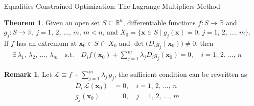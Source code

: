 \documentclass[10pt]{beamer}
\newcommand{\ds}{\displaystyle}
\theoremstyle{definition}
\newtheorem*{thm}{Theorem}
\newtheorem*{rmk}{Remark}
\newcommand{\vx}{\mathbf{x}}
\begin{document}
\begin{frame}{Equalities Constrained Optimization: The Lagrange Multipliers Method}


\begin{thm}%
  Given an open set $S\subseteq\mathbb{R}^n$, differentiable functions $f:S\to\mathbb{R}$ and $g_j:S\to\mathbb{R}$, $j=1,\,2,\,\ldots,\,m$, $m < n$, and $\ds X_0 = \big\{\vx\in S\;|\;g_j(\vx) = 0,\,j=1,\,2,\,\ldots,\,m\big\}$. If $f$ has an extremum at $\ds\vx_0\in S\,\cap\,X_0$ and $\det\big(D_i g_j(\vx_0)\big)\ne 0$, then
  \begin{align*}
    \exists\,\lambda_1,\,\lambda_2,\,\ldots,\,\lambda_m\quad\text{s.t.}\quad D_i f(\vx_0) + \sum_{j = 1}^m\lambda_j D_i g_j(\vx_0) = 0,\quad\ds i = 1,\,2,\,\ldots,\,n
  \end{align*}
\end{thm}
\begin{rmk}
  Let $\ds\mathcal{L}\equiv f + \sum_{j = 1}^m \lambda_j\,g_j$, the sufficient condition can be rewritten as
  \begin{align*}
    D_i\,\mathcal{L}(\vx_0) &= 0,\quad i = 1,\,2,\,\ldots,\,n \\
    g_j(\vx_0) &= 0,\quad j=1,\,2,\,\ldots,\,m
  \end{align*}
\end{rmk}
\end{frame}
\end{document}
